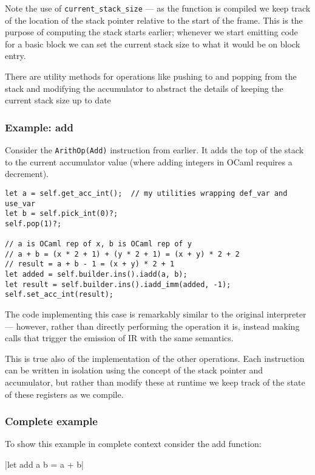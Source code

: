 Note the use of \texttt{current\_stack\_size} --- as the function is compiled we keep track of the
location of the stack pointer relative to the start of the frame. This is the purpose of computing
the stack starts earlier; whenever we start emitting code for a basic block we can set the current
stack size to what it would be on block entry.

There are utility methods for operations like pushing to and popping from the stack and modifying
the accumulator to abstract the details of keeping the current stack size up to date

\subsubsection{Example: add}

Consider the \texttt{ArithOp(Add)} instruction from earlier. It adds the top of the stack to the
current accumulator value (where adding integers in OCaml requires a decrement).

\begin{verbatim}
let a = self.get_acc_int();  // my utilities wrapping def_var and use_var
let b = self.pick_int(0)?;
self.pop(1)?;

// a is OCaml rep of x, b is OCaml rep of y
// a + b = (x * 2 + 1) + (y * 2 + 1) = (x + y) * 2 + 2
// result = a + b - 1 = (x + y) * 2 + 1
let added = self.builder.ins().iadd(a, b);
let result = self.builder.ins().iadd_imm(added, -1);
self.set_acc_int(result);
\end{verbatim}

The code implementing this case is remarkably similar to the original interpreter --- however,
rather
than directly performing the operation it is, instead making calls that trigger the emission of IR
with the same semantics.

This is true also of the implementation of the other operations. Each instruction can be written in
isolation using the concept of the stack pointer and accumulator, but rather than modify these at
runtime we keep track of the state of these registers as we compile.

\subsubsection{Complete example}

To show this example in complete context consider the add function:

|let add a b = a + b|

